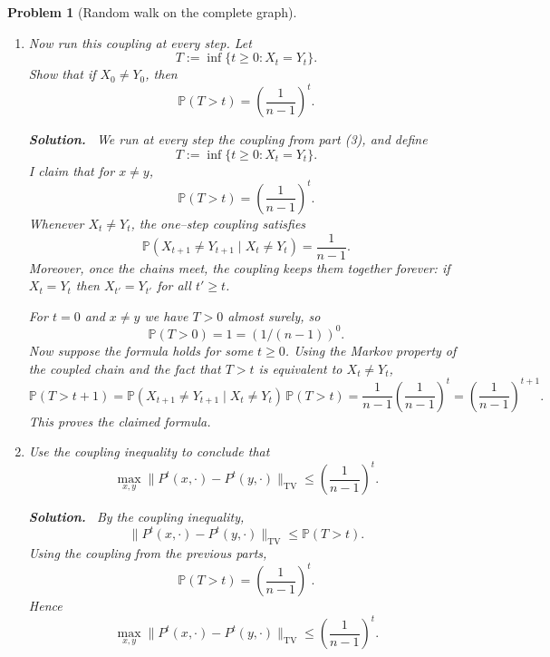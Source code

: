 \documentclass[11pt]{article}
\newtheorem{problem}{Problem}
\newenvironment{solution}{\par\noindent\textbf{Solution.}\ }{\par}
\begin{document}
\begin{problem}[Random walk on the complete graph]
\begin{enumerate}
\begin{solution}
Under this coupling the chains disagree only in the first case, when
$(X_1,Y_1) = (y,x)$. Hence
\[
  \mathbb{P}(X_1 \neq Y_1) = \frac{1}{n-1}.
\]
From part (2), $\|P(x,\cdot) - P(y,\cdot)\|_{\mathrm{TV}} = 1/(n-1)$, so this
coupling achieves the total variation distance.\qedhere
\end{solution}

\item Now run this coupling at every step. Let
\[
  T := \inf\{t \ge 0 : X_t = Y_t\}.
\]
Show that if $X_0 \neq Y_0$, then
\[ \mathbb{P}(T > t) = \left(\frac{1}{n-1}\right)^t . \]

\begin{solution}
We run at every step the coupling from part (3), and define
\[
  T := \inf\{t \ge 0 : X_t = Y_t\}.
\]
I claim that for $x \neq y$,
\[
  \mathbb{P}(T > t) = \left(\frac{1}{n-1}\right)^t.
\]
Whenever $X_t \neq Y_t$, the one–step coupling satisfies
\[
  \mathbb{P}(X_{t+1} \neq Y_{t+1} \mid X_t \neq Y_t) = \frac{1}{n-1}.
\]
Moreover, once the chains meet, the coupling keeps them together forever: if
$X_t = Y_t$ then $X_{t'} = Y_{t'}$ for all $t' \ge t$.

For $t=0$ and $x \neq y$ we have $T>0$ almost surely, so
\[ \mathbb{P}(T>0) = 1 = (1/(n-1))^0. \]
Now suppose the formula holds for some $t \ge 0$. Using the Markov property of
the coupled chain and the fact that $T>t$ is equivalent to $X_t \neq Y_t$,
\[
  \mathbb{P}(T > t+1)
  = \mathbb{P}(X_{t+1} \neq Y_{t+1} \mid X_t \neq Y_t)\,\mathbb{P}(T>t)
  = \frac{1}{n-1}\left(\frac{1}{n-1}\right)^t
  = \left(\frac{1}{n-1}\right)^{t+1}.
\]
This proves the claimed formula.\qedhere
\end{solution}

\item Use the coupling inequality to conclude that
\[
  \max_{x,y} \|P^t(x,\cdot) - P^t(y,\cdot)\|_{\mathrm{TV}}
  \le \left(\frac{1}{n-1}\right)^t.
\]

\begin{solution}
By the coupling inequality,
\[
  \|P^t(x,\cdot) - P^t(y,\cdot)\|_{\mathrm{TV}}
  \le \mathbb{P}(T>t).
\]
Using the coupling from the previous parts,
\[
  \mathbb{P}(T>t) = \left(\frac{1}{n-1}\right)^t.
\]
Hence
\[
  \max_{x,y} \|P^t(x,\cdot) - P^t(y,\cdot)\|_{\mathrm{TV}}
  \le \left(\frac{1}{n-1}\right)^t.
\]
\qedhere
\end{solution}

\end{enumerate}
\end{problem}
\end{document}
